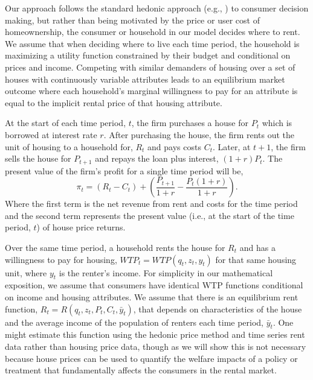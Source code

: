 \documentclass[ecta,nameyear,draft]{econsocart}
\theoremstyle{plain}
\theoremstyle{remark}
\begin{document}
Our approach follows the standard hedonic approach (e.g., \cite{rosen74}) to consumer decision making, but rather than being motivated by the price or user cost of homeownership, the consumer or household in our model decides where to rent. We assume that when deciding where to live each time period, the household is maximizing a utility function constrained by their budget and conditional on prices and income. Competing with similar demanders of housing over a set of houses with continuously variable attributes leads to an equilibrium market outcome where each household's marginal willingness to pay for an attribute is equal to the implicit rental price of that housing attribute. 

At the start of each time period, $t$, the firm purchases a house for $P_t$ which is borrowed at interest rate $r$. After purchasing the house, the firm rents out the unit of housing to a household for, $R_t$ and pays costs $C_t$. Later, at $t+1$, the firm sells the house for $P_{t+1}$ and repays the loan plus interest, $(1 + r)P_t$.  The present value of the firm’s profit for a single time period will be,
\begin{equation}
	\pi_t = (R_t-C_t)+\left(\frac{P_{t+1}}{1+r}-\frac{P_t(1+r)}{1+r}\right).\label{pi1}
\end{equation}
Where the first term is the net revenue from rent and costs for the time period and the second term
represents the present value (i.e., at the start of the time period, $t$) of house price returns.

Over the same time period, a household rents the house for $R_t$ and has a willingness to pay for housing, $\mathit{WTP}_t=\mathit{WTP}(q_t,z_t,y_t)$ for that same housing unit, where $y_t$ is the renter's income. For simplicity in our mathematical exposition, we assume that consumers have identical WTP functions conditional on income and housing attributes. We  assume that there is an equilibrium rent function, $R_t=R(q_t,z_t,P_t,C_t,\bar{y}_t)$, that depends on characteristics of the house and the average income of the population of renters each time period, $\bar{y}_t$. One might estimate this function using the hedonic price method and time series rent data rather than housing price data, though as we will show this is not necessary because house prices can be used to quantify the welfare impacts of a policy or treatment that fundamentally affects the consumers in the rental market. 
\end{document}

